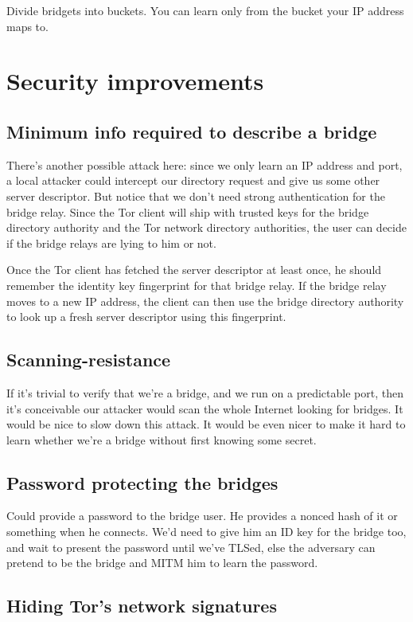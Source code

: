 \documentclass{llncs}
\begin{document}
Divide bridgets into buckets. You can learn only from the bucket your
IP address maps to.

\section{Security improvements}

\subsection{Minimum info required to describe a bridge}

There's another possible attack here: since we only learn an IP address
and port, a local attacker could intercept our directory request and
give us some other server descriptor. But notice that we don't need
strong authentication for the bridge relay. Since the Tor client will
ship with trusted keys for the bridge directory authority and the Tor
network directory authorities, the user can decide if the bridge relays
are lying to him or not.

Once the Tor client has fetched the server descriptor at least once,
he should remember the identity key fingerprint for that bridge relay.
If the bridge relay moves to a new IP address, the client can then
use the bridge directory authority to look up a fresh server descriptor
using this fingerprint.

\subsection{Scanning-resistance}

If it's trivial to verify that we're a bridge, and we run on a predictable
port, then it's conceivable our attacker would scan the whole Internet
looking for bridges. It would be nice to slow down this attack. It would
be even nicer to make it hard to learn whether we're a bridge without
first knowing some secret.

\subsection{Password protecting the bridges}
Could provide a password to the bridge user. He provides a nonced hash of
it or something when he connects. We'd need to give him an ID key for the
bridge too, and wait to present the password until we've TLSed, else the
adversary can pretend to be the bridge and MITM him to learn the password.


\subsection{Hiding Tor's network signatures}
\label{subsec:enclave-dirs}
\end{document}

